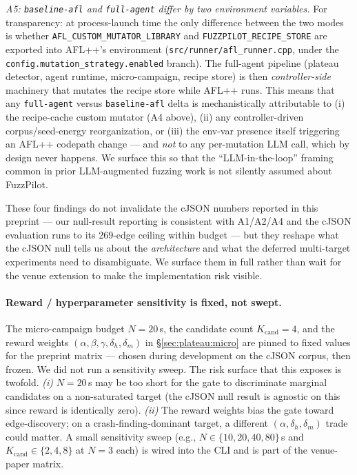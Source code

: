 \documentclass[11pt]{article}
\begin{document}
\emph{A5: \texttt{baseline-afl} and \texttt{full-agent} differ by
two environment variables.}
For transparency: at process-launch time the only difference
between the two modes is whether
\texttt{AFL\_CUSTOM\_MUTATOR\_LIBRARY} and
\texttt{FUZZPILOT\_RECIPE\_STORE} are exported into AFL++'s
environment (\texttt{src/runner/afl\_runner.cpp}, under the
\texttt{config.mutation\_strategy.enabled} branch). The full-agent
pipeline (plateau detector, agent runtime, micro-campaign, recipe
store) is then \emph{controller-side} machinery that mutates the
recipe store while AFL++ runs. This means that any
\texttt{full-agent} versus \texttt{baseline-afl} delta is
mechanistically attributable to (i) the recipe-cache custom mutator
(A4 above), (ii) any controller-driven corpus/seed-energy
reorganization, or (iii) the env-var presence itself triggering an
AFL++ codepath change --- and \emph{not} to any per-mutation LLM
call, which by design never happens. We surface this so that the
``LLM-in-the-loop'' framing common in prior LLM-augmented fuzzing
work is not silently assumed about FuzzPilot.

These four findings do not invalidate the cJSON numbers reported in
this preprint --- our null-result reporting is consistent with
A1/A2/A4 and the cJSON evaluation runs to its $269$-edge ceiling
within budget --- but they reshape what the cJSON null tells us
about the \emph{architecture} and what the deferred multi-target
experiments need to disambiguate. We surface them in full rather
than wait for the venue extension to make the implementation risk
visible.

\paragraph{Reward / hyperparameter sensitivity is fixed, not
swept.}
The micro-campaign budget $N{=}20$\,s, the candidate count
$K_{\text{cand}}{=}4$, and the reward weights
$(\alpha,\beta,\gamma,\delta_h,\delta_m)$ in
\S\ref{sec:plateau:micro} are pinned to fixed values for the
preprint matrix --- chosen during development on the cJSON
corpus, then frozen. We did not run a sensitivity sweep. The
risk surface that this exposes is twofold. \emph{(i)} $N{=}20$\,s
may be too short for the gate to discriminate marginal
candidates on a non-saturated target (the cJSON null result is
agnostic on this since reward is identically zero). \emph{(ii)}
The reward weights bias the gate toward edge-discovery; on a
crash-finding-dominant target, a different
$(\alpha,\delta_h,\delta_m)$ trade could matter. A small
sensitivity sweep (e.g., $N \in \{10,20,40,80\}$\,s and
$K_{\text{cand}}\in\{2,4,8\}$ at $N{=}3$ each) is wired into the
CLI and is part of the venue-paper matrix.
\end{document}

